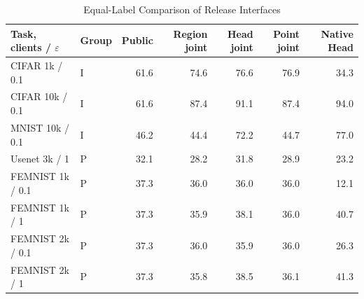 \begin{table}[t]
\caption{Equal-Label Comparison of Release Interfaces}
\label{tab:joint-controls}\small
\centering
\begin{tabular}{@{}llrrrrr@{}}\toprule
Task, clients / $\varepsilon$ & Group & Public & Region joint & Head joint & Point joint & Native Head \\
\midrule
CIFAR 1k / 0.1 & I & 61.6 & 74.6 & 76.6 & 76.9 & 34.3 \\
CIFAR 10k / 0.1 & I & 61.6 & 87.4 & 91.1 & 87.4 & 94.0 \\
MNIST 10k / 0.1 & I & 46.2 & 44.4 & 72.2 & 44.7 & 77.0 \\
Usenet 3k / 1 & P & 32.1 & 28.2 & 31.8 & 28.9 & 23.2 \\
FEMNIST 1k / 0.1 & P & 37.3 & 36.0 & 36.0 & 36.0 & 12.1 \\
FEMNIST 1k / 1 & P & 37.3 & 35.9 & 38.1 & 36.0 & 40.7 \\
FEMNIST 2k / 0.1 & P & 37.3 & 36.0 & 35.9 & 36.0 & 26.3 \\
FEMNIST 2k / 1 & P & 37.3 & 35.8 & 38.5 & 36.1 & 41.3 \\
\bottomrule\end{tabular}
\end{table}
